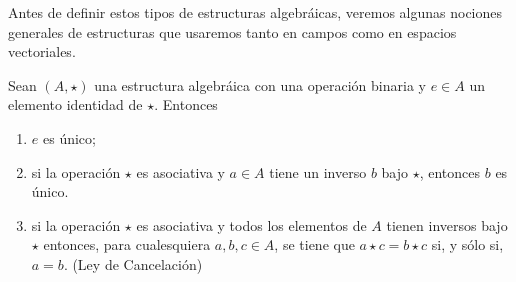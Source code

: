 \documentclass[apuntes]{subfiles}
\begin{document}
Antes de definir estos tipos de estructuras algebráicas, veremos algunas nociones generales de estructuras que usaremos tanto en campos como en espacios vectoriales.
    
\begin{prop}\label{prop:1.2}
    Sean $(A,\star)$ una estructura algebráica con una operación binaria y $e\in A$ un elemento identidad de $\star$. Entonces

    \begin{enumerate}[label=(\alph*)]
        \item $e$ es único;

        \item si la operación $\star$ es asociativa y $a\in A$ tiene un inverso $b$ bajo $\star$, entonces $b$ es único.

        \item si la operación $\star$ es asociativa y todos los elementos de $A$ tienen inversos bajo $\star$ entonces, para cualesquiera $a,b,c\in A$, se tiene que $a\star c=b\star c$ si, y sólo si, $a=b$. (Ley de Cancelación)
    \end{enumerate}
\end{prop}
    
\end{document}
